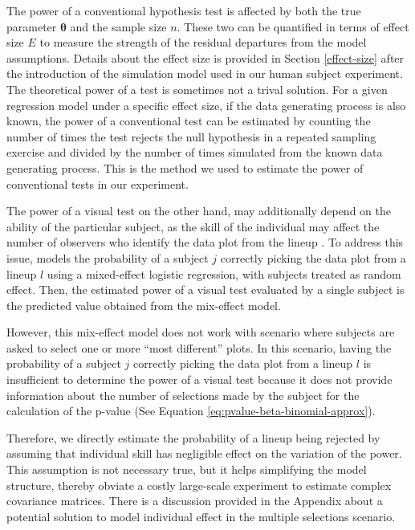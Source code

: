 \documentclass[]{interact}
\theoremstyle{plain}%
\theoremstyle{definition}
\theoremstyle{remark}
\begin{document}
The power of a conventional hypothesis test is affected by both the true
parameter \(\boldsymbol{\theta}\) and the sample size \(n\). These two
can be quantified in terms of effect size \(E\) to measure the strength
of the residual departures from the model assumptions. Details about the
effect size is provided in Section \ref{effect-size} after the
introduction of the simulation model used in our human subject
experiment. The theoretical power of a test is sometimes not a trival
solution. For a given regression model under a specific effect size, if
the data generating process is also known, the power of a conventional
test can be estimated by counting the number of times the test rejects
the null hypothesis in a repeated sampling exercise and divided by the
number of times simulated from the known data generating process. This
is the method we used to estimate the power of conventional tests in our
experiment.

The power of a visual test on the other hand, may additionally depend on
the ability of the particular subject, as the skill of the individual
may affect the number of observers who identify the data plot from the
lineup \citep{majumder_validation_2013}. To address this issue,
\citet{majumder_validation_2013} models the probability of a subject
\(j\) correctly picking the data plot from a lineup \(l\) using a
mixed-effect logistic regression, with subjects treated as random
effect. Then, the estimated power of a visual test evaluated by a single
subject is the predicted value obtained from the mix-effect model.

However, this mix-effect model does not work with scenario where
subjects are asked to select one or more ``most different'' plots. In
this scenario, having the probability of a subject \(j\) correctly
picking the data plot from a lineup \(l\) is insufficient to determine
the power of a visual test because it does not provide information about
the number of selections made by the subject for the calculation of the
p-value (See Equation \ref{eq:pvalue-beta-binomial-approx}).

Therefore, we directly estimate the probability of a lineup being
rejected by assuming that individual skill has negligible effect on the
variation of the power. This assumption is not necessary true, but it
helps simplifying the model structure, thereby obviate a costly
large-scale experiment to estimate complex covariance matrices. There is
a discussion provided in the Appendix about a potential solution to
model individual effect in the multiple selections scenario.
\end{document}
